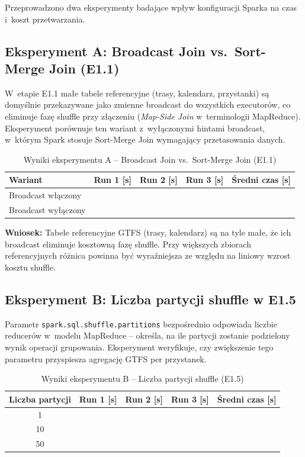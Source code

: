 \documentclass{labreport}
\begin{document}
Przeprowadzono dwa eksperymenty badające wpływ konfiguracji Sparka na czas i~koszt przetwarzania.

\subsection{Eksperyment A: Broadcast Join vs.\ Sort-Merge Join (E1.1)}

W~etapie E1.1 małe tabele referencyjne (trasy, kalendarz, przystanki) są domyślnie przekazywane jako zmienne broadcast do wszystkich executorów, co eliminuje fazę shuffle przy złączeniu (\textit{Map-Side Join} w~terminologii MapReduce). Eksperyment porównuje ten wariant z~wyłączonymi hintami broadcast, w~którym Spark stosuje Sort-Merge Join wymagający przetasowania danych.

\begin{table}[H]
\centering
\caption{Wyniki eksperymentu A -- Broadcast Join vs.\ Sort-Merge Join (E1.1)}
\renewcommand{\arraystretch}{1.3}
\begin{tabular}{|l|c|c|c|c|}
\hline
\rowcolor{gray!20}
\textbf{Wariant} & \textbf{Run 1 [s]} & \textbf{Run 2 [s]} & \textbf{Run 3 [s]} & \textbf{Średni czas [s]} \\ \hline
Broadcast włączony & & & & \\ \hline
Broadcast wyłączony & & & & \\ \hline
\end{tabular}
\end{table}

\textbf{Wniosek:} Tabele referencyjne GTFS (trasy, kalendarz) są na tyle małe, że ich broadcast eliminuje kosztowną fazę shuffle. Przy większych zbiorach referencyjnych różnica powinna być wyraźniejsza ze względu na liniowy wzrost kosztu shuffle.

\subsection{Eksperyment B: Liczba partycji shuffle w E1.5}

Parametr \texttt{spark.sql.shuffle.partitions} bezpośrednio odpowiada liczbie reducerów w~modelu MapReduce -- określa, na ile partycji zostanie podzielony wynik operacji grupowania. Eksperyment weryfikuje, czy zwiększenie tego parametru przyspiesza agregację GTFS per przystanek.

\begin{table}[H]
\centering
\caption{Wyniki eksperymentu B -- Liczba partycji shuffle (E1.5)}
\renewcommand{\arraystretch}{1.3}
\begin{tabular}{|c|c|c|c|c|}
\hline
\rowcolor{gray!20}
\textbf{Liczba partycji} & \textbf{Run 1 [s]} & \textbf{Run 2 [s]} & \textbf{Run 3 [s]} & \textbf{Średni czas [s]} \\ \hline
1  & & & & \\ \hline
10 & & & & \\ \hline
50 & & & & \\ \hline
\end{tabular}
\end{table}
\end{document}
